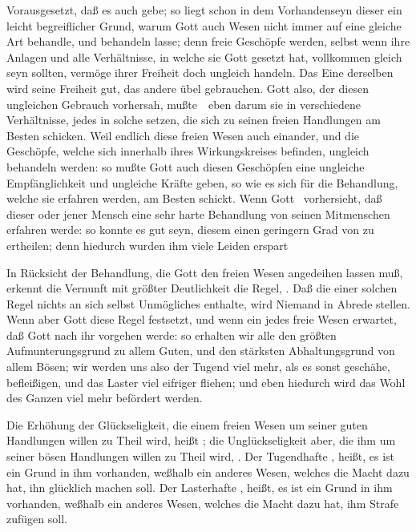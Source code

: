 \begin{aufza}
\begin{aufzb}
\item Vorausgesetzt, daß es auch  gebe; so liegt schon in dem Vorhandenseyn dieser ein leicht begreiflicher Grund, warum Gott auch  Wesen nicht immer auf eine gleiche Art behandle, und behandeln lasse; denn freie Geschöpfe werden, selbst wenn ihre Anlagen und alle Verhältnisse, in welche sie Gott gesetzt hat, vollkommen gleich seyn sollten, vermöge ihrer Freiheit doch ungleich handeln. Das Eine derselben wird seine Freiheit gut, das andere übel gebrauchen. Gott also, der diesen ungleichen Gebrauch vorhersah, mußte~\ eben darum sie in verschiedene Verhältnisse, jedes in solche setzen, die sich zu seinen freien Handlungen am Besten schicken. Weil endlich diese freien Wesen auch einander, und die Geschöpfe, welche sich innerhalb ihres Wirkungskreises befinden, ungleich behandeln werden: so mußte Gott auch diesen Geschöpfen eine ungleiche Empfänglichkeit und ungleiche Kräfte geben, so wie es sich für die Behandlung, welche sie erfahren werden, am Besten schickt. Wenn Gott \zB\ vorhersieht, daß dieser oder jener Mensch eine sehr harte Behandlung von seinen Mitmenschen erfahren werde: so konnte es gut seyn, diesem einen geringern Grad von  zu ertheilen; denn hiedurch wurden ihm viele Leiden erspart \usw\
\end{aufzb}
\item In Rücksicht der Behandlung, die Gott den freien Wesen angedeihen lassen muß, erkennt die Vernunft mit größter Deutlichkeit die Regel, . Daß die  einer solchen Regel nichts an sich selbst Unmögliches enthalte, wird Niemand in Abrede stellen. Wenn aber Gott diese Regel festsetzt, und wenn ein jedes freie Wesen erwartet, daß Gott nach ihr vorgehen werde: so erhalten wir alle den größten Aufmunterungsgrund zu allem Guten, und den stärksten Abhaltungsgrund von allem Bösen; wir werden uns also der Tugend viel mehr, als es sonst geschähe, befleißigen, und das Laster viel eifriger fliehen; und eben hiedurch wird das Wohl des Ganzen viel mehr befördert werden.
\begin{RWanm}
Die Erhöhung der Glückseligkeit, die einem freien Wesen um seiner guten Handlungen willen zu Theil wird, heißt ; die Unglückseligkeit aber, die ihm um seiner bösen Handlungen willen zu Theil wird, . Der Tugendhafte , heißt, es ist ein Grund in ihm vorhanden, weßhalb ein anderes Wesen, welches die Macht dazu hat, ihn glücklich machen soll. Der Lasterhafte , heißt, es ist ein Grund in ihm vorhanden, weßhalb ein anderes Wesen, welches die Macht dazu hat, ihm Strafe zufügen soll.~

\end{RWanm}
\end{aufza}
